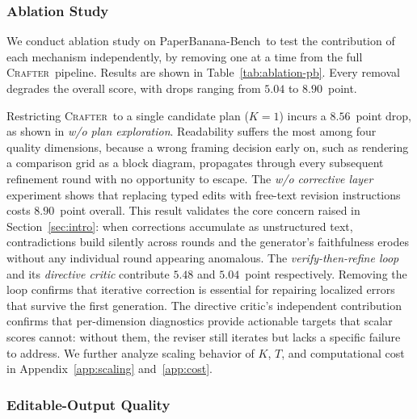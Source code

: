 \documentclass{article}
\newcommand{\Crafter}{\textsc{Crafter}\xspace}
\newcommand{\PaperBananaBench}{PaperBanana-Bench\xspace}
\begin{document}
\subsubsection{Ablation Study}
\label{sec:exp-ablation-crafter}

We conduct ablation study on \PaperBananaBench\ to test the contribution of each mechanism independently, by removing one at a time from the full \Crafter\ pipeline. Results are shown in Table~\ref{tab:ablation-pb}. Every removal degrades the overall score, with drops ranging from $5.04$ to $8.90$~point.

Restricting \Crafter\ to a single candidate plan ($K{=}1$) incurs a $8.56$~point drop, as shown in \textit{w/o plan exploration}. Readability suffers the most among four quality dimensions, because a wrong framing decision early on, such as rendering a comparison grid as a block diagram, propagates through every subsequent refinement round with no opportunity to escape.
The \textit{w/o corrective layer} experiment shows that replacing typed edits with free-text revision instructions costs $8.90$~point overall. This result validates the core concern raised in Section~\ref{sec:intro}: when corrections accumulate as unstructured text, contradictions build silently across rounds and the generator's faithfulness erodes without any individual round appearing anomalous.
The \textit{verify-then-refine loop} and its \textit{directive critic} contribute $5.48$ and $5.04$~point respectively. Removing the loop confirms that iterative correction is essential for repairing localized errors that survive the first generation. The directive critic's independent contribution confirms that per-dimension diagnostics provide actionable targets that scalar scores cannot: without them, the reviser still iterates but lacks a specific failure to address.
We further analyze scaling behavior of $K$, $T$, and computational cost in Appendix~\ref{app:scaling} and~\ref{app:cost}.




\subsubsection{Editable-Output Quality}
\label{sec:exp-editable}
\end{document}
